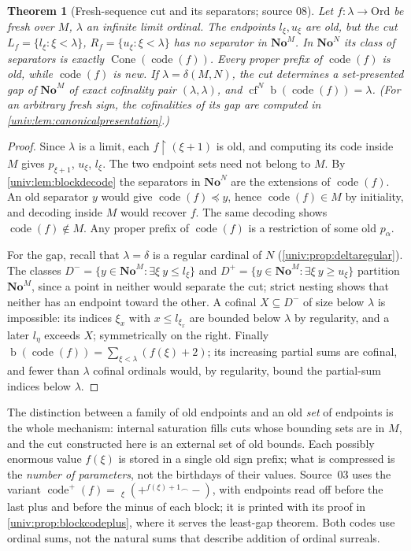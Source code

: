 \documentclass[11pt,letterpaper]{article}
\numberwithin{equation}{section}
\newtheorem{theorem}{Theorem}[section]
\theoremstyle{definition}
\theoremstyle{remark}
\newcommand{\No}{\mathbf{No}}
\newcommand{\NoM}{\No^{M}}
\newcommand{\NoN}{\No^{N}}
\newcommand{\Ord}{\mathrm{Ord}}
\newcommand{\bd}{\operatorname{b}}
\newcommand{\cf}{\operatorname{cf}}
\newcommand{\Cone}{\operatorname{Cone}}
\newcommand{\code}{\operatorname{code}}
\newcommand{\codeplus}{\operatorname{code}^{+}}
\newcommand{\res}{\mathbin{\upharpoonright}}
\newcommand{\cat}{\mathbin{{}^{\frown}}}
\begin{document}
\begin{theorem}[Fresh-sequence cut and its separators; source 08]\label{univ:thm:freshcode}
Let $f:\lambda\to\Ord$ be fresh over $M$, $\lambda$ an infinite limit ordinal.
The endpoints $l_\xi,u_\xi$ are old, but the cut
$L_f=\{l_\xi:\xi<\lambda\}$, $R_f=\{u_\xi:\xi<\lambda\}$ has no separator in
$\NoM$. In $\NoN$ its class of separators is exactly $\Cone(\code(f))$. Every
proper prefix of $\code(f)$ is old, while $\code(f)$ is new. If
$\lambda=\delta(M,N)$, the cut determines a set-presented gap of $\NoM$ of
exact cofinality pair $(\lambda,\lambda)$, and
$\cf^N\bd(\code(f))=\lambda$. \textup{(For an arbitrary fresh sign, the
cofinalities of its gap are computed in \cref{univ:lem:canonicalpresentation}.)}
\end{theorem}
\begin{proof}
Since $\lambda$ is a limit, each $f\res(\xi+1)$ is old, and computing its code
inside $M$ gives $p_{\xi+1}$, $u_\xi$, $l_\xi$. The two endpoint sets need not
belong to $M$. By \cref{univ:lem:blockdecode} the separators in $\NoN$ are the
extensions of $\code(f)$. An old separator $y$ would give
$\code(f)\preceq y$, hence $\code(f)\in M$ by initiality, and decoding inside
$M$ would recover $f$. The same decoding shows $\code(f)\notin M$. Any proper
prefix of $\code(f)$ is a restriction of some old $p_\alpha$.

For the gap, recall that $\lambda=\delta$ is a regular cardinal of $N$
(\cref{univ:prop:deltaregular}). The classes $D^-=\{y\in\NoM:\exists\xi\ y\le l_\xi\}$ and
$D^+=\{y\in\NoM:\exists\xi\ y\ge u_\xi\}$ partition $\NoM$, since a point in
neither would separate the cut; strict nesting shows that neither has an
endpoint toward the other. A cofinal $X\subseteq D^-$ of size below $\lambda$
is impossible: its indices $\xi_x$ with $x\le l_{\xi_x}$ are bounded below
$\lambda$ by regularity, and a later $l_\eta$ exceeds $X$; symmetrically on
the right. Finally $\bd(\code(f))=\sum_{\xi<\lambda}(f(\xi)+2)$; its increasing
partial sums are cofinal, and fewer than $\lambda$ cofinal ordinals would, by
regularity, bound the partial-sum indices below $\lambda$.
\end{proof}

The distinction between a family of old endpoints and an old \emph{set} of
endpoints is the whole mechanism: internal saturation fills cuts whose
bounding sets are in $M$, and the cut constructed here is an external set of
old bounds. Each possibly enormous value $f(\xi)$ is stored in a single old
sign prefix; what is compressed is the \emph{number of parameters}, not the
birthdays of their values. Source~03 uses the variant
$\codeplus(f)=\mathop{\cat}_{\xi}(+^{f(\xi)+1}\cat-)$, with endpoints read off
before the last plus and before the minus of each block; it is printed with
its proof in \cref{univ:prop:blockcodeplus}, where it serves the least-gap
theorem. Both codes use ordinal sums, not the natural sums that describe
addition of ordinal surreals.
\end{document}
